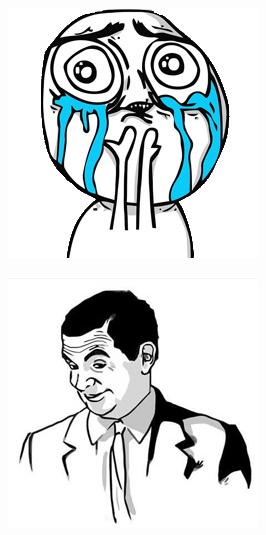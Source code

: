 \begin{multicols}{8}
\begin{center}
\includegraphics[width=\linewidth]{./IMG-GIT/MEMES/Meme-troll-lloron.jpg}
\end{center}

\begin{center}
\includegraphics[width=\linewidth]{./IMG-GIT/MEMES/Meme-Faces-10.jpg}            
\end{center}


\end{multicols}
